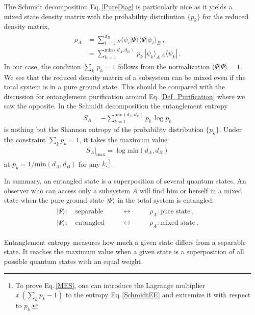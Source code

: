 The Schmidt decomposition Eq.\,\eqref{PureDiag} is particularly nice as it yields a mixed state density matrix with the probability distribution $\{ p_k\}$ for the reduced density matrix,
\begin{align}\label{Red_DM_A}
\begin{aligned}
	\rho_A &= \sum_{i=1}^{d_B} {}_B\langle \psi_i | \Psi \rangle \langle \Psi | \psi_i \rangle_B \ ,\\
		&= \sum_{k=1}^{\text{min}(d_A, d_B)}\, p_k\, |\psi_k\rangle_A\, {}_A\langle \psi_k | \ .
\end{aligned}
\end{align}
In our case, the condition $\sum_k\, p_k = 1$ follows from the normalization $\langle \Psi |\Psi\rangle = 1$.
We see that the reduced density matrix of a subsystem can be mixed even if the total system is in a pure ground state.
This should be compared with the discussion for entanglement purification around Eq.\,\eqref{Def_Purification} where we saw the opposite.
In the Schmidt decomposition the entanglement entropy 
\begin{align}\label{SchmidtEE}
S_A = - \sum_{k=1}^{\text{min}(d_A, d_B)} p_k \,\log p_k
\end{align}
is nothing but the Shannon entropy of the probability distribution $\{ p_k\}$.
Under the constraint $\sum_k p_k = 1$, it takes the maximum value
\begin{align}\label{MES}
S_A|_\text{max} = \log \text{min}(d_A, d_B)
\end{align}
at $p_k = 1/\text{min}(d_A, d_B)$ for any $k$.\footnote{To prove Eq.\,\eqref{MES}, one can introduce the Lagrange multiplier $x\,(\sum_{k}p_k -1)$ to the entropy Eq.\,\eqref{SchmidtEE} and extremize it with respect to $p_k$.}


\bigskip
In summary, an entangled state is a superposition of several quantum states.
An observer who can  access only a subsystem $A$ will find him or herself in a mixed state when the pure ground state $|\Psi\rangle$ in the total system is entangled:
\begin{align}
\begin{aligned}
	 |\Psi\rangle:& ~\text{separable} \qquad &\longleftrightarrow \qquad &\rho_A: \text{pure state} \ , \\
	 |\Psi\rangle:& ~\text{entangled} \qquad &\longleftrightarrow \qquad &\rho_A: \text{mixed state} \ .
\end{aligned}
\end{align}

Entanglement entropy measures how much a given state differs from a separable state.
It reaches the maximum value when a given state is a superposition of all possible quantum states with an equal weight. 



